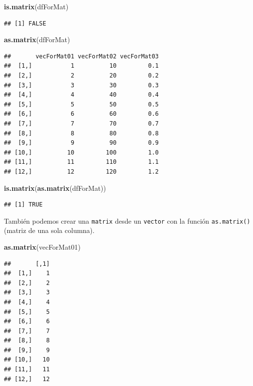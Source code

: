 \documentclass[
]{book}
\newenvironment{Shaded}{\begin{snugshade}}{\end{snugshade}}
\newcommand{\KeywordTok}[1]{\textcolor[rgb]{0.13,0.29,0.53}{\textbf{#1}}}
\newcommand{\NormalTok}[1]{#1}
\begin{document}
\begin{Shaded}
\begin{Highlighting}[]
\KeywordTok{is.matrix}\NormalTok{(dfForMat)}
\end{Highlighting}
\end{Shaded}

\begin{verbatim}
## [1] FALSE
\end{verbatim}

\begin{Shaded}
\begin{Highlighting}[]
\KeywordTok{as.matrix}\NormalTok{(dfForMat)}
\end{Highlighting}
\end{Shaded}

\begin{verbatim}
##       vecForMat01 vecForMat02 vecForMat03
##  [1,]           1          10         0.1
##  [2,]           2          20         0.2
##  [3,]           3          30         0.3
##  [4,]           4          40         0.4
##  [5,]           5          50         0.5
##  [6,]           6          60         0.6
##  [7,]           7          70         0.7
##  [8,]           8          80         0.8
##  [9,]           9          90         0.9
## [10,]          10         100         1.0
## [11,]          11         110         1.1
## [12,]          12         120         1.2
\end{verbatim}

\begin{Shaded}
\begin{Highlighting}[]
\KeywordTok{is.matrix}\NormalTok{(}\KeywordTok{as.matrix}\NormalTok{(dfForMat))}
\end{Highlighting}
\end{Shaded}

\begin{verbatim}
## [1] TRUE
\end{verbatim}

También podemos crear una \texttt{matrix} desde un \texttt{vector} con la función \texttt{as.matrix()} (matriz de una sola columna).

\begin{Shaded}
\begin{Highlighting}[]
\KeywordTok{as.matrix}\NormalTok{(vecForMat01)}
\end{Highlighting}
\end{Shaded}

\begin{verbatim}
##       [,1]
##  [1,]    1
##  [2,]    2
##  [3,]    3
##  [4,]    4
##  [5,]    5
##  [6,]    6
##  [7,]    7
##  [8,]    8
##  [9,]    9
## [10,]   10
## [11,]   11
## [12,]   12
\end{verbatim}
\end{document}
